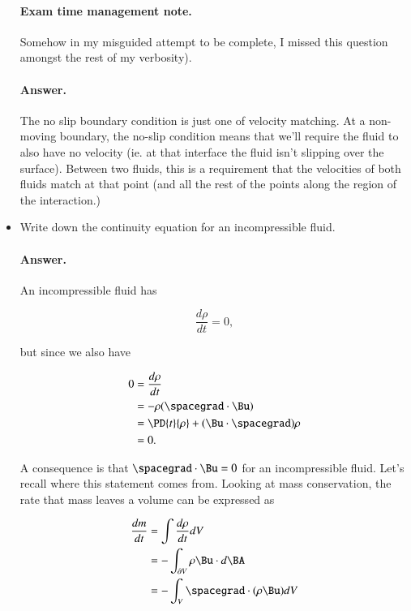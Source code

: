 \begin{itemize}
\paragraph{Exam time management note.} Somehow in my misguided attempt to be complete, I missed this question amongst the rest of my verbosity).

\paragraph{Answer.}
The no slip boundary condition is just one of velocity matching.  At a non-moving boundary, the no-slip condition means that we'll require the fluid to also have no velocity (ie. at that interface the fluid isn't slipping over the surface).  Between two fluids, this is a requirement that the velocities of both fluids match at that point (and all the rest of the points along the region of the interaction.)

\item Write down the continuity equation for an incompressible fluid.
\paragraph{Answer.}

An incompressible fluid has

\begin{equation}\label{eqn:continuumMidTermReflection:210}
\frac{d\rho}{dt} = 0,
\end{equation}

but since we also have

\begin{align*}
0 
&=
\frac{d\rho}{dt} \\
&= - \rho (\spacegrad \cdot \Bu)  \\
&= 
\PD{t}{\rho} + (\Bu \cdot \spacegrad) \rho \\
&= 0.
\end{align*}

A consequence is that $\spacegrad \cdot \Bu = 0$ for an incompressible fluid.  Let's recall where this statement comes from.  Looking at mass conservation, the rate that mass leaves a volume can be expressed as

\begin{align*}
\frac{dm}{dt}
&= \int \frac{d\rho}{dt} dV \\
&= -\int_{\partial V} \rho \Bu \cdot d\BA \\
&= -\int_V \spacegrad \cdot (\rho \Bu) dV
\end{align*}


\end{itemize}
